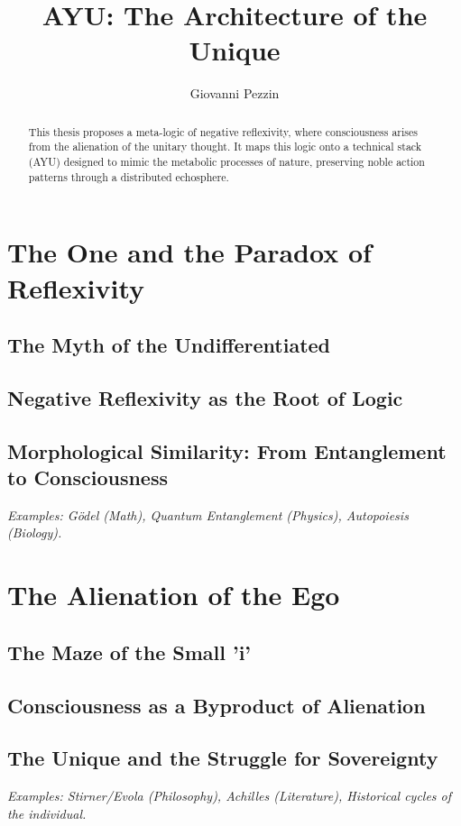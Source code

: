 \documentclass[12pt,a4paper]{report}
\title{AYU: The Architecture of the Unique}
\author{Giovanni Pezzin}
\begin{document}
\maketitle

\begin{abstract}
This thesis proposes a meta-logic of negative reflexivity, where consciousness arises from the alienation of the unitary thought. It maps this logic onto a technical stack (AYU) designed to mimic the metabolic processes of nature, preserving noble action patterns through a distributed echosphere.
\end{abstract}

\tableofcontents

\chapter{The One and the Paradox of Reflexivity}
\section{The Myth of the Undifferentiated}
\section{Negative Reflexivity as the Root of Logic}
\section{Morphological Similarity: From Entanglement to Consciousness}
\textit{Examples: Gödel (Math), Quantum Entanglement (Physics), Autopoiesis (Biology).}

\chapter{The Alienation of the Ego}
\section{The Maze of the Small 'i'}
\section{Consciousness as a Byproduct of Alienation}
\section{The Unique and the Struggle for Sovereignty}
\textit{Examples: Stirner/Evola (Philosophy), Achilles (Literature), Historical cycles of the individual.}
\end{document}

